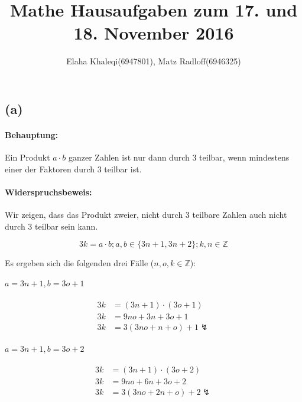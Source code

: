\documentclass[11pt,a4paper]{article}
\title{\textbf{Mathe Hausaufgaben zum 17. und 18. November 2016}}
\author{Elaha Khaleqi(6947801), Matz Radloff(6946325)}
\begin{document}
  \maketitle
  \date{}

\section{} %

\subsection*{(a)}

\paragraph{Behauptung:}
Ein Produkt $a \cdot b$ ganzer Zahlen ist nur dann durch $3$ teilbar, wenn mindestens einer der Faktoren durch $3$ teilbar ist.

\paragraph{Widerspruchsbeweis:}
Wir zeigen, dass das Produkt zweier, nicht durch $3$ teilbare Zahlen auch nicht durch $3$ teilbar sein kann.

\begin{equation*}
3k = a \cdot b; a,b \in \{3n+1, 3n+2\}; k,n \in \mathbb{Z}
\end{equation*}

Es ergeben sich die folgenden drei Fälle ($n, o, k \in \mathbb{Z}$):

\paragraph{$a = 3n+1, b = 3o+1$}

\begin{align*}
    3k &= (3n+1) \cdot (3o+1)\\
    3k &= 9no + 3n + 3o + 1\\
    3k &= 3(3no + n + o) + 1 \lightning
\end{align*}

\paragraph{$a = 3n+1, b = 3o+2$}

\begin{align*}
    3k &= (3n+1) \cdot (3o+2)\\
    3k &= 9no + 6n + 3o + 2\\
    3k &= 3(3no + 2n + o) + 2 \lightning
\end{align*}
\end{document}
